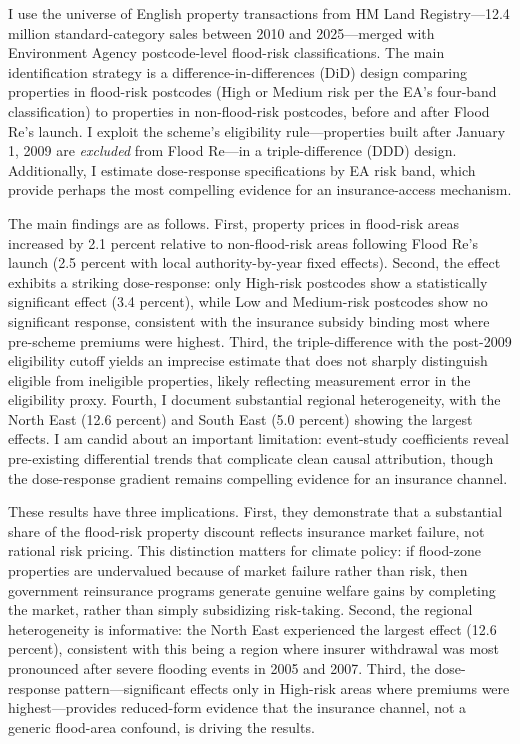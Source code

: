 \documentclass[12pt]{article}
\begin{document}
I use the universe of English property transactions from HM Land Registry---12.4 million standard-category sales between 2010 and 2025---merged with Environment Agency postcode-level flood-risk classifications. The main identification strategy is a difference-in-differences (DiD) design comparing properties in flood-risk postcodes (High or Medium risk per the EA's four-band classification) to properties in non-flood-risk postcodes, before and after Flood Re's launch. I exploit the scheme's eligibility rule---properties built after January 1, 2009 are \textit{excluded} from Flood Re---in a triple-difference (DDD) design. Additionally, I estimate dose-response specifications by EA risk band, which provide perhaps the most compelling evidence for an insurance-access mechanism.

The main findings are as follows. First, property prices in flood-risk areas increased by 2.1 percent relative to non-flood-risk areas following Flood Re's launch (2.5 percent with local authority-by-year fixed effects). Second, the effect exhibits a striking dose-response: only High-risk postcodes show a statistically significant effect (3.4 percent), while Low and Medium-risk postcodes show no significant response, consistent with the insurance subsidy binding most where pre-scheme premiums were highest. Third, the triple-difference with the post-2009 eligibility cutoff yields an imprecise estimate that does not sharply distinguish eligible from ineligible properties, likely reflecting measurement error in the eligibility proxy. Fourth, I document substantial regional heterogeneity, with the North East (12.6 percent) and South East (5.0 percent) showing the largest effects. I am candid about an important limitation: event-study coefficients reveal pre-existing differential trends that complicate clean causal attribution, though the dose-response gradient remains compelling evidence for an insurance channel.

These results have three implications. First, they demonstrate that a substantial share of the flood-risk property discount reflects insurance market failure, not rational risk pricing. This distinction matters for climate policy: if flood-zone properties are undervalued because of market failure rather than risk, then government reinsurance programs generate genuine welfare gains by completing the market, rather than simply subsidizing risk-taking. Second, the regional heterogeneity is informative: the North East experienced the largest effect (12.6 percent), consistent with this being a region where insurer withdrawal was most pronounced after severe flooding events in 2005 and 2007. Third, the dose-response pattern---significant effects only in High-risk areas where premiums were highest---provides reduced-form evidence that the insurance channel, not a generic flood-area confound, is driving the results.
\end{document}
